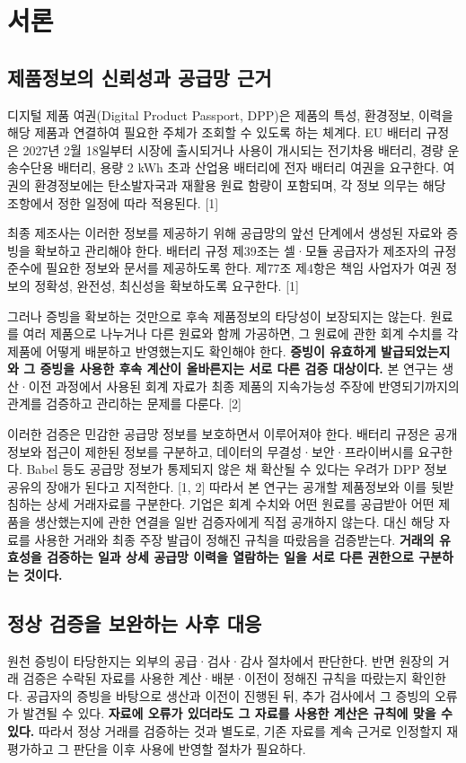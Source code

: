\section{서론}
\subsection{제품정보의 신뢰성과 공급망 근거}
디지털 제품 여권(Digital Product Passport, DPP)은 제품의 특성, 환경정보, 이력을 해당 제품과 연결하여 필요한 주체가 조회할 수 있도록 하는 체계다.
EU 배터리 규정은 2027년 2월 18일부터 시장에 출시되거나 사용이 개시되는 전기차용 배터리, 경량 운송수단용 배터리, 용량 2 kWh 초과 산업용 배터리에 전자 배터리 여권을 요구한다.
여권의 환경정보에는 탄소발자국과 재활용 원료 함량이 포함되며, 각 정보 의무는 해당 조항에서 정한 일정에 따라 적용된다. [1]

최종 제조사는 이러한 정보를 제공하기 위해 공급망의 앞선 단계에서 생성된 자료와 증빙을 확보하고 관리해야 한다.
배터리 규정 제39조는 셀·모듈 공급자가 제조자의 규정 준수에 필요한 정보와 문서를 제공하도록 한다.
제77조 제4항은 책임 사업자가 여권 정보의 정확성, 완전성, 최신성을 확보하도록 요구한다. [1]

그러나 증빙을 확보하는 것만으로 후속 제품정보의 타당성이 보장되지는 않는다.
원료를 여러 제품으로 나누거나 다른 원료와 함께 가공하면, 그 원료에 관한 회계 수치를 각 제품에 어떻게 배분하고 반영했는지도 확인해야 한다.
\textbf{증빙이 유효하게 발급되었는지와 그 증빙을 사용한 후속 계산이 올바른지는 서로 다른 검증 대상이다.}
본 연구는 생산·이전 과정에서 사용된 회계 자료가 최종 제품의 지속가능성 주장에 반영되기까지의 관계를 검증하고 관리하는 문제를 다룬다. [2]

이러한 검증은 민감한 공급망 정보를 보호하면서 이루어져야 한다.
배터리 규정은 공개 정보와 접근이 제한된 정보를 구분하고, 데이터의 무결성·보안·프라이버시를 요구한다.
Babel 등도 공급망 정보가 통제되지 않은 채 확산될 수 있다는 우려가 DPP 정보 공유의 장애가 된다고 지적한다. [1, 2]
따라서 본 연구는 공개할 제품정보와 이를 뒷받침하는 상세 거래자료를 구분한다.
기업은 회계 수치와 어떤 원료를 공급받아 어떤 제품을 생산했는지에 관한 연결을 일반 검증자에게 직접 공개하지 않는다.
대신 해당 자료를 사용한 거래와 최종 주장 발급이 정해진 규칙을 따랐음을 검증받는다.
\textbf{거래의 유효성을 검증하는 일과 상세 공급망 이력을 열람하는 일을 서로 다른 권한으로 구분하는 것이다.}

\subsection{정상 검증을 보완하는 사후 대응}
원천 증빙이 타당한지는 외부의 공급·검사·감사 절차에서 판단한다.
반면 원장의 거래 검증은 수락된 자료를 사용한 계산·배분·이전이 정해진 규칙을 따랐는지 확인한다.
공급자의 증빙을 바탕으로 생산과 이전이 진행된 뒤, 추가 검사에서 그 증빙의 오류가 발견될 수 있다.
\textbf{자료에 오류가 있더라도 그 자료를 사용한 계산은 규칙에 맞을 수 있다.}
따라서 정상 거래를 검증하는 것과 별도로, 기존 자료를 계속 근거로 인정할지 재평가하고 그 판단을 이후 사용에 반영할 절차가 필요하다.

